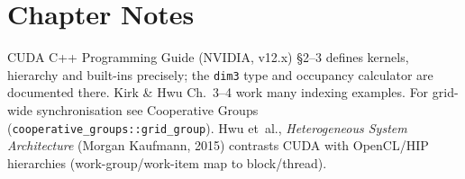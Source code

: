\section*{Chapter Notes}
CUDA C++ Programming Guide (NVIDIA, v12.x) \S2--3 defines kernels, hierarchy and built-ins precisely; the \texttt{dim3} type and occupancy calculator are documented there. Kirk \& Hwu Ch.~3--4 work many indexing examples. For grid-wide synchronisation see Cooperative Groups (\texttt{cooperative\_groups::grid\_group}). Hwu et~al., \emph{Heterogeneous System Architecture} (Morgan Kaufmann, 2015) contrasts CUDA with OpenCL/HIP hierarchies (work-group/work-item map to block/thread).
